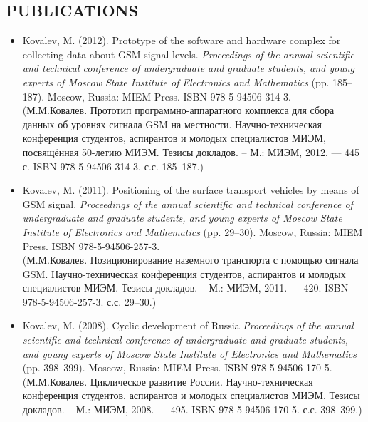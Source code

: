 \documentclass{res}
\begin{document}
\begin{resume}
\section{PUBLICATIONS}
\begin{itemize}
	\item
		Kovalev, M. (2012). Prototype of the software and hardware complex for collecting data about GSM signal levels. \emph{Proceedings of the annual scientific and technical conference of undergraduate and graduate students, and young experts of Moscow State Institute of Electronics and Mathematics} (pp. 185--187). Moscow, Russia: MIEM Press. ISBN 978-5-94506-314-3.\\
		(М.М.Ковалев. Прототип программно-аппаратного комплекса для сбора данных об уровнях сигнала GSM на местности. Научно-техническая конференция студентов, аспирантов и молодых специалистов МИЭМ, посвящённая 50-летию МИЭМ. Тезисы докладов. -- М.: МИЭМ, 2012. --- 445 с. ISBN 978-5-94506-314-3. с.с. 185--187.)
	\item
		Kovalev, M. (2011). Positioning of the surface transport vehicles by means of GSM signal. \emph{Proceedings of the annual scientific and technical conference of undergraduate and graduate students, and young experts of Moscow State Institute of Electronics and Mathematics} (pp. 29--30). Moscow, Russia: MIEM Press. ISBN 978-5-94506-257-3.\\
		(М.М.Ковалев. Позиционирование наземного транспорта с помощью сигнала GSM. Научно-техническая конференция студентов, аспирантов и молодых специалистов МИЭМ. Тезисы докладов. -- М.: МИЭМ, 2011. --- 420. ISBN 978-5-94506-257-3. с.с. 29--30.)
	\item
		Kovalev, M. (2008). Cyclic development of Russia \emph{Proceedings of the annual scientific and technical conference of undergraduate and graduate students, and young experts of Moscow State Institute of Electronics and Mathematics} (pp. 398--399). Moscow, Russia: MIEM Press. ISBN 978-5-94506-170-5.\\
		(М.М.Ковалев. Циклическое развитие России. Научно-техническая конференция студентов, аспирантов и молодых специалистов МИЭМ. Тезисы докладов. -- М.: МИЭМ, 2008. --- 495. ISBN 978-5-94506-170-5. с.с. 398--399.)

\end{itemize}


\end{resume}
\end{document}
